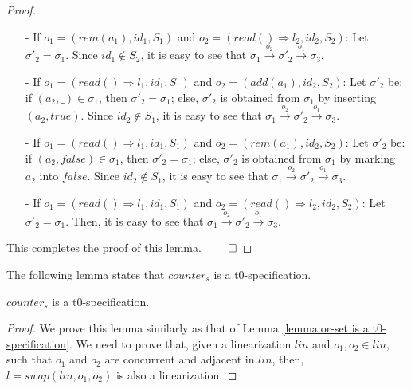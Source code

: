 {\begin {proof}
\begin{itemize}
\item[-] If $o_1 = (\mathit{rem}(a_1),\mathit{id}_1,S_1)$ and $o_2 = (\mathit{read}() \Rightarrow l_2,\mathit{id}_2,S_2)$: Let $\sigma'_2 = \sigma_1$. Since $\mathit{id}_1 \notin S_2$, it is easy to see that $\sigma_1 {\xrightarrow{o_2}} \sigma'_2 {\xrightarrow{o_1}} \sigma_3$.

\item[-] If $o_1 = (\mathit{read}() \Rightarrow l_1,\mathit{id}_1,S_1)$ and $o_2 = (\mathit{add}(a_1),\mathit{id}_2,S_2)$: Let $\sigma'_2$ be: if $(a_2,\_) \in \sigma_1$, then $\sigma'_2 = \sigma_1$; else, $\sigma'_2$ is obtained from $\sigma_1$ by inserting $(a_2,\mathit{true})$. Since $\mathit{id}_2 \notin S_1$, it is easy to see that $\sigma_1 {\xrightarrow{o_2}} \sigma'_2 {\xrightarrow{o_1}} \sigma_3$.

\item[-] If $o_1 = (\mathit{read}() \Rightarrow l_1,\mathit{id}_1,S_1)$ and $o_2 = (\mathit{rem}(a_1),\mathit{id}_2,S_2)$: Let $\sigma'_2$ be: if $(a_2,\mathit{false}) \in \sigma_1$, then $\sigma'_2 = \sigma_1$; else, $\sigma'_2$ is obtained from $\sigma_1$ by marking $a_2$ into $\mathit{false}$. Since $\mathit{id}_2 \notin S_1$, it is easy to see that $\sigma_1 {\xrightarrow{o_2}} \sigma'_2 {\xrightarrow{o_1}} \sigma_3$.

\item[-] If $o_1 = (\mathit{read}() \Rightarrow l_1,\mathit{id}_1,S_1)$ and $o_2 = (\mathit{read}() \Rightarrow l_2,\mathit{id}_2,S_2)$: Let $\sigma'_2 = \sigma_1$. Then, it is easy to see that $\sigma_1 {\xrightarrow{o_2}} \sigma'_2 {\xrightarrow{o_1}} \sigma_3$.
\end{itemize}

This completes the proof of this lemma. $\qed$
\end {proof}




The following lemma states that $\mathit{counter}_s$ is a t0-specification.

\begin{lemma}
\label{lemma:counter is a t0-specification}
$\mathit{counter}_s$ is a t0-specification.
\end{lemma}


\begin {proof}

We prove this lemma similarly as that of Lemma \ref{lemma:or-set is a t0-specification}. We need to prove that, given a linearization $\mathit{lin}$ and $o_1,o_2 \in \mathit{lin}$, such that $o_1$ and $o_2$ are concurrent and adjacent in $\mathit{lin}$, then, $l = \mathit{swap}(\mathit{lin},o_1,o_2)$ is also a linearization.


\end{proof}}
